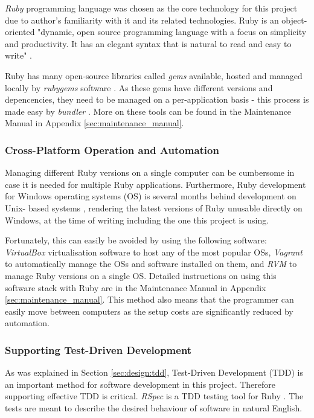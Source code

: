 \textit{Ruby} programming language was chosen as the core technology for this
project due to author's familiarity with it and its related technologies. Ruby
is an object-oriented "dynamic, open source programming language with a focus
on simplicity and productivity. It has an elegant syntax that is natural to
read and easy to write" \parencite{Ruby}.

Ruby has many open-source libraries called \textit{gems} available, hosted and
managed locally by \textit{rubygems} software \parencite{Rubygems}. As these
gems have different versions and depencencies, they need to be managed on a
per-application basis - this process is made easy by \textit{bundler}
\parencite{Bundler}. More on these tools can be found in the Maintenance Manual
in Appendix \ref{sec:maintenance_manual}.

\subsubsection{Cross-Platform Operation and Automation}

Managing different Ruby versions on a single computer can be cumbersome in case
it is needed for multiple Ruby applications. Furthermore, Ruby development for
Windows operating systems (OS) is several months behind development on Unix-
based systems \parencite{Ruby}, rendering the latest versions of Ruby unusable
directly on Windows, at the time of writing including the one this project is
using.

Fortunately, this can easily be avoided by using the following software:
\textit{VirtualBox} \parencite{Virtualbox} virtualisation software to host any
of the most popular OSs, \textit{Vagrant} \parencite{Vagrant} to automatically
manage the OSs and software installed on them, and \textit{RVM} \parencite{Rvm}
to manage Ruby versions on a single OS. Detailed instructions on using this
software stack with Ruby are in the Maintenance Manual in Appendix
\ref{sec:maintenance_manual}. This method also means that the programmer can
easily move between computers as the setup costs are significantly reduced by
automation.


\subsubsection{Supporting Test-Driven Development}
\label{sec:design:software:tdd}

As was explained in Section \ref{sec:design:tdd}, Test-Driven Development (TDD)
is an important method for software development in this project. Therefore
supporting effective TDD is critical. \textit{RSpec} is a TDD testing tool for
Ruby \parencite{Rspec}. The tests are meant to describe the desired behaviour of
software in natural English.

